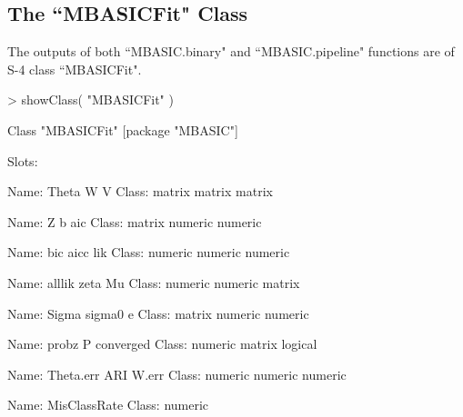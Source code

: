 \documentclass[a4paper,10pt]{article}
\begin{document}
\begin{Schunk}
\end{Schunk}

\subsection{The ``MBASICFit" Class}

The outputs of both ``MBASIC.binary" and ``MBASIC.pipeline" functions are of S-4 class ``MBASICFit". 

\begin{Schunk}
\begin{Sinput}
> showClass( "MBASICFit" )
\end{Sinput}
\begin{Soutput}
Class "MBASICFit" [package "MBASIC"]

Slots:
                                             
Name:         Theta            W            V
Class:       matrix       matrix       matrix
                                             
Name:             Z            b          aic
Class:       matrix      numeric      numeric
                                             
Name:           bic         aicc          lik
Class:      numeric      numeric      numeric
                                             
Name:        alllik         zeta           Mu
Class:      numeric      numeric       matrix
                                             
Name:         Sigma       sigma0            e
Class:       matrix      numeric      numeric
                                             
Name:         probz            P    converged
Class:      numeric       matrix      logical
                                             
Name:     Theta.err          ARI        W.err
Class:      numeric      numeric      numeric
                   
Name:  MisClassRate
Class:      numeric
\end{Soutput}
\end{Schunk}
\end{document}
